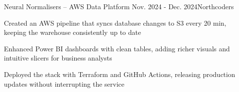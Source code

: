 \begin{rSubsection}{Neural Normalisers – AWS Data Platform} {Nov. 2024 - Dec. 2024}{Northcoders}{}
\item Created an AWS pipeline that syncs database changes to S3 every 20 min, keeping the warehouse consistently up to date
\item Enhanced Power BI dashboards with clean tables, adding richer visuals and intuitive slicers for business analysts
\item Deployed the stack with Terraform and GitHub Actions, releasing production updates without interrupting the service
\end{rSubsection}